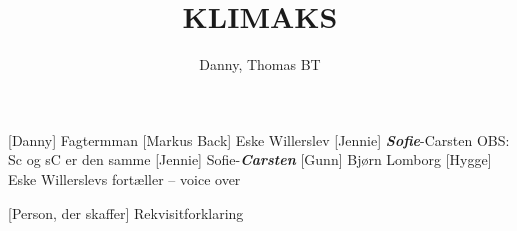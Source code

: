 \documentclass[a4paper,11pt]{article}
\title{KLIMAKS}
\author{Danny, Thomas BT}
\begin{document}
\maketitle

\begin{roles}
    [Danny] Fagtermman
    [Markus Back] Eske Willerslev
    [Jennie] \emph{\textbf{Sofie}}-Carsten OBS: Sc og sC er den samme
    [Jennie] Sofie-\emph{\textbf{Carsten}}
    [Gunn] Bjørn Lomborg
    [Hygge] Eske Willerslevs fortæller -- voice over
\end{roles}

\begin{props}
    [Person, der skaffer] Rekvisitforklaring
\end{props}
\end{document}
